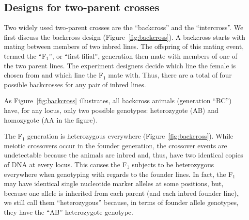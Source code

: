 \documentclass[oneside]{book}\usepackage[]{graphicx}\usepackage[]{color}
\begin{document}



































\subsection{Designs for two-parent crosses}

Two widely used two-parent crosses are the ``backcross'' and the ``intercross''. We first discuss the backcross design (Figure~\ref{fig:backcross}). A backcross starts with mating between members of two inbred lines. The offspring of this mating event, termed the ``F$_1$'', or ``first filial'', generation then mate with members of one of the two parent lines. The experiment designers decide which line the female is chosen from and which line the F$_1$ mate with. Thus, there are a total of four possible backcrosses for any pair of inbred lines. 

As Figure~\ref{fig:backcross} illustrates, all backcross animals (generation ``BC'') have, for any locus, only two possible genotypes: heterozygote (AB) and homozygote (AA in the figure). 

The F$_1$ generation is heterozygous everywhere (Figure~\ref{fig:backcross}).
While meiotic crossovers occur in the founder generation, the crossover events are
undetectable because the animals are inbred and, thus, have two identical copies
of DNA at every locus. This causes the F$_1$ subjects to be heterozygous everywhere
when genotyping with regards to the founder lines.
In fact, the F$_1$ may have identical single nucleotide marker alleles at some
positions, but, because one allele is inherited from each parent (and each inbred
founder line), we still call them ``heterozygous'' because, in terms of founder allele genotypes, they have the ``AB'' heterozygote genotype.
\end{document}
